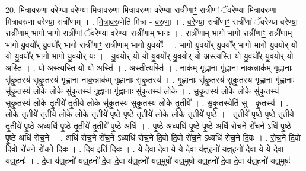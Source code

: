 \documentclass[17pt]{extarticle}
\begin{document}
20. मि॒त्रा॒व॒रु॒णा॒ व॒रे॒ण्या॒ व॒रे॒ण्या॒ मि॒त्रा॒व॒रु॒णा॒ मि॒त्रा॒व॒रु॒णा॒ व॒रे॒ण्या॒ रात्री॑णाꣳ॒॒ रात्री॑णां ॅवरेण्या मित्रावरुणा मित्रावरुणा वरेण्या॒ रात्री॑णाम् । . मि॒त्रा॒व॒रु॒णेति॑ मित्रा - व॒रु॒णा॒ । . व॒रे॒ण्या॒ रात्री॑णाꣳ॒॒ रात्री॑णां ॅवरेण्या वरेण्या॒ रात्री॑णाम् भा॒गो भा॒गो रात्री॑णां ॅवरेण्या वरेण्या॒ रात्री॑णाम् भा॒गः । . रात्री॑णाम् भा॒गो भा॒गो रात्री॑णाꣳ॒॒ रात्री॑णाम् भा॒गो यु॒वयो᳚र् यु॒वयो᳚र् भा॒गो रात्री॑णाꣳ॒॒ रात्री॑णाम् भा॒गो यु॒वयोः᳚ । . भा॒गो यु॒वयो᳚र् यु॒वयो᳚र् भा॒गो भा॒गो यु॒वयो॒र् यो यो यु॒वयो᳚र् भा॒गो भा॒गो यु॒वयो॒र् यः । . यु॒वयो॒र् यो यो यु॒वयो᳚र् यु॒वयो॒र् यो अस्त्यस्ति॒ यो यु॒वयो᳚र् यु॒वयो॒र् यो अस्ति॑ । . यो अस्त्यस्ति॒ यो यो अस्ति॑ । . अस्तीत्यस्ति॑ । . नाक॑म् गृह्णा॒ना गृ॑ह्णा॒ना नाक॒न्नाक॑म् गृह्णा॒नाः सु॑कृ॒तस्य॑ सुकृ॒तस्य॑ गृह्णा॒ना नाक॒न्नाक॑म् गृह्णा॒नाः सु॑कृ॒तस्य॑ । . गृ॒ह्णा॒नाः सु॑कृ॒तस्य॑ सुकृ॒तस्य॑ गृह्णा॒ना गृ॑ह्णा॒नाः सु॑कृ॒तस्य॑ लो॒के लो॒के सु॑कृ॒तस्य॑ गृह्णा॒ना गृ॑ह्णा॒नाः सु॑कृ॒तस्य॑ लो॒के । . सु॒कृ॒तस्य॑ लो॒के लो॒के सु॑कृ॒तस्य॑ सुकृ॒तस्य॑ लो॒के तृ॒तीये॑ तृ॒तीये॑ लो॒के सु॑कृ॒तस्य॑ सुकृ॒तस्य॑ लो॒के तृ॒तीये᳚ । . सु॒कृ॒तस्येति॑ सु - कृ॒तस्य॑ । . लो॒के तृ॒तीये॑ तृ॒तीये॑ लो॒के लो॒के तृ॒तीये॑ पृ॒ष्ठे पृ॒ष्ठे तृ॒तीये॑ लो॒के लो॒के तृ॒तीये॑ पृ॒ष्ठे । . तृ॒तीये॑ पृ॒ष्ठे पृ॒ष्ठे तृ॒तीये॑ तृ॒तीये॑ पृ॒ष्ठे अध्यधि॑ पृ॒ष्ठे तृ॒तीये॑ तृ॒तीये॑ पृ॒ष्ठे अधि॑ । . पृ॒ष्ठे अध्यधि॑ पृ॒ष्ठे पृ॒ष्ठे अधि॑ रोच॒ने रो॑च॒ने ऽधि॑ पृ॒ष्ठे पृ॒ष्ठे अधि॑ रोच॒ने । . अधि॑ रोच॒ने रो॑च॒ने ऽध्यधि॑ रोच॒ने दि॒वो दि॒वो रो॑च॒ने ऽध्यधि॑ रोच॒ने दि॒वः । . रो॒च॒ने दि॒वो दि॒वो रो॑च॒ने रो॑च॒ने दि॒वः । . दि॒व इति॑ दि॒वः । . ये दे॒वा दे॒वा ये ये दे॒वा य॑ज्ञ्॒हनो॑ यज्ञ्॒हनो॑ दे॒वा ये ये दे॒वा य॑ज्ञ्॒हनः॑ । . दे॒वा य॑ज्ञ्॒हनो॑ यज्ञ्॒हनो॑ दे॒वा दे॒वा य॑ज्ञ्॒हनो॑ यज्ञ्॒मुषो॑ यज्ञ्॒मुषो॑ यज्ञ्॒हनो॑ दे॒वा दे॒वा य॑ज्ञ्॒हनो॑ यज्ञ्॒मुषः॑ । \newline
\end{document}
